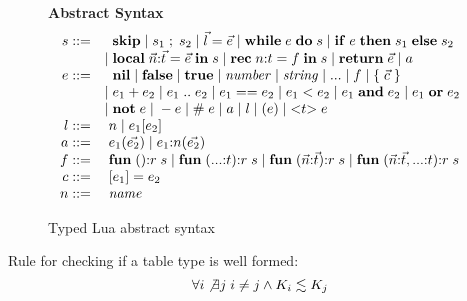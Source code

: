 \begin{figure}[!ht]
\textbf{Abstract Syntax}\\
\dstart
$$
\begin{array}{rl}
s ::= & \;\; \mathbf{skip} \; | \;
s_{1} \; ; \; s_{2} \; | \;
\vec{l} = \vec{e}  \; | \;
\mathbf{while} \; e \; \mathbf{do} \; s \; | \;
\mathbf{if} \; e \; \mathbf{then} \; s_{1} \; \mathbf{else} \; s_{2}\\
& | \; \mathbf{local} \; \vec{n}{:}\vec{t} = \vec{e} \; \mathbf{in} \; s \; | \;
\mathbf{rec} \; n{:}t = f \; \mathbf{in} \; s \; | \;
\mathbf{return} \; \vec{e} \; | \;
a\\
e ::= & \;\; \mathbf{nil} \; | \;
\mathbf{false} \; | \;
\mathbf{true} \; | \;
{\it number} \; | \;
{\it string} \; | \;
{...} \; | \;
f \; | \;
\{ \; \vec{c} \; \} \\
& | \; e_{1} + e_{2} \; | \;
e_{1} \; {..} \; e_{2} \; | \;
e_{1} == e_{2} \; | \;
e_{1} < e_{2} \; | \;
e_{1} \; \mathbf{and} \; e_{2} \; | \;
e_{1} \; \mathbf{or} \; e_{2} \\
& | \; \mathbf{not} \; e \; | \;
- e \; | \;
\# \; e \; | \;
a \; | \;
l \; | \;
(e) \; | \;
{<}t{>} \; e\\
l ::= & \; n \; | \;
e_{1}[e_{2}]\\
a ::= & \; e_{1}(\vec{e_{2}}) \; | \;
e_{1}{:}n(\vec{e_{2}})\\
f ::= & \; \mathbf{fun} \; (){:}r \; s \; | \;
\mathbf{fun} \; ({...}{:}t){:}r \; s \; | \;
\mathbf{fun} \; (\vec{n}{:}\vec{t}){:}r \; s \; | \;
\mathbf{fun} \; (\vec{n}{:}\vec{t},{...}{:}t){:}r \; s\\
c ::= & \; [e_{1}] = e_{2}\\
n ::= & \; {\it name}\\
\end{array}
$$
\dend
\caption{Typed Lua abstract syntax}
\label{fig:syntax}
\end{figure}

Rule for checking if a table type is well formed:
\[
\forall i \not\exists j \; i \not= j \wedge K_{i} \lesssim K_{j}
\]


